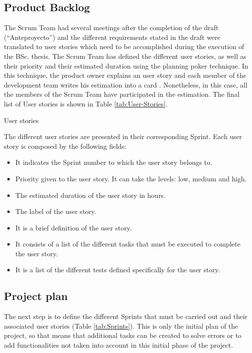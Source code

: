 \subsection{Product Backlog}
The Scrum Team had several meetings after the completion of the draft (“Anteproyecto”) and the different requirements stated in the draft were translated to user stories which need to be accomplished during the execution of the BSc. thesis. The Scrum Team has defined the different user stories, as well as their priority and their estimated duration using the planning poker technique. In this technique, the product owner explains an user story and each member of the development team writes his estimation into a card \cite{Gar18}. Nonetheless, in this case, all the members of the Scrum Team have participated in the estimation. The final list of User stories is shown in Table \ref{tab:User-Stories}.

\begin{table}[hp]
	\centering
	{\small
		
	}
	\caption{User stories}
	\label{tab:User-Stories}
\end{table}
	
The different user stories are presented in their corresponding Sprint. Each user story is composed by the following fields:
\begin{itemize}
	\item {} It indicates the Sprint number to which the user story belongs to.
	\item {} Priority given to the user story. It can take the levels: low, medium and high.
	\item {} The estimated duration of the user story in hours. 
	\item {} The label of the user story.
	\item {} It is a brief definition of the user story.
	\item {} It consists of a list of the different tasks that must be executed to complete the user story.
	\item {} It is a list of the different tests defined specifically for the user story.
\end{itemize}

\subsection{Project plan}
The next step is to define the different Sprints that must be carried out and their associated user stories (Table \ref{tab:Sprints}). This is only the initial plan of the project, so that means that additional tasks can be created to solve errors or to add functionalities not taken into account in this initial phase of the project.

